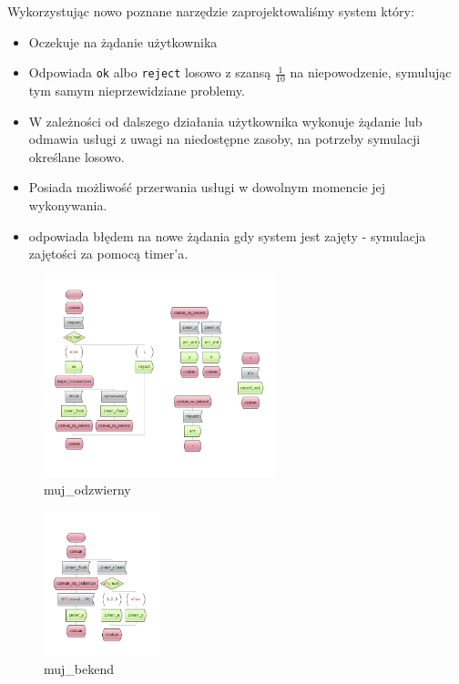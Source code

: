 \documentclass[a4paper,12pt]{article}
\begin{document}
    \newpage

    Wykorzystując nowo poznane narzędzie zaprojektowaliśmy system który:
    \begin{itemize}
        \item Oczekuje na żądanie użytkownika
        \item Odpowiada \texttt{ok} albo \texttt{reject} losowo z szansą $\frac{1}{10}$ na niepowodzenie, symulując tym samym nieprzewidziane problemy.
        \item W zależności od dalszego działania użytkownika wykonuje żądanie lub odmawia usługi z uwagi na niedostępne zasoby, na potrzeby symulacji określane losowo.
        \item Posiada możliwość przerwania usługi w dowolnym momencie jej wykonywania.
        \item odpowiada błędem na nowe żądania gdy system jest zajęty - symulacja zajętości za pomocą timer'a.
    \end{itemize}

    \begin{figure}[H]
        \centering
        \includegraphics[width=0.6\textwidth]{images/process1.png}
        \caption{muj\_odzwierny}
    \end{figure}

    \begin{figure}[H]
        \centering
        \includegraphics[width=0.3\textwidth]{images/process2.png}
        \caption{muj\_bekend}
    \end{figure}
\end{document}
